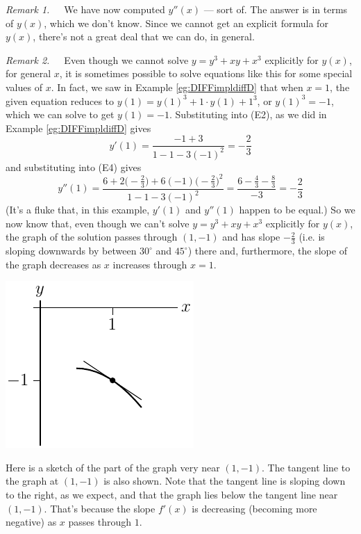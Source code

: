 \begin{eg}
\noindent\emph{Remark 1.}\ \ \ We have now computed $y''(x)$ --- sort of.
The answer is in terms of $y(x)$, which we don't know. Since we cannot
get an explicit formula for $y(x)$, there's not a great deal that we can do,
in general.

\noindent\emph{Remark 2.}\ \ \ Even though we cannot solve
$y=y^3+xy+x^3$ explicitly for $y(x)$, for general $x$, it is sometimes
possible to solve equations like this for some special values of $x$.
In fact, we saw in Example \ref{eg:DIFFimpldiffD} that when $x=1$,
the given equation reduces to $y(1)=y(1)^3+1\cdot y(1)+1^3$, or $y(1)^3=-1$,
which we can solve to get $y(1)=-1$. Substituting into (E2),
as we did in  Example \ref{eg:DIFFimpldiffD} gives
\begin{equation*}
y'(1) = \frac{-1+3}{1-1-3(-1)^2} = -\frac{2}{3}
\end{equation*}
and substituting into (E4) gives
\begin{equation*}
y''(1) = \frac{6+2\big(-\frac{2}{3}\big)+6(-1)\big(-\frac{2}{3}\big)^2}
                             {1-1-3(-1)^2}
   =\frac{6-\frac{4}{3}-\frac{8}{3}}{-3}
   = -\frac{2}{3}
\end{equation*}
(It's a fluke that, in this example, $y'(1)$ and $y''(1)$ happen to be equal.)
So we now know that, even though we can't solve $y=y^3+xy+x^3$ explicitly for
$y(x)$, the graph of the solution passes through $(1,-1)$ and has slope
$-\frac{2}{3}$ (i.e. is sloping downwards by between $30^\circ$ and $45^\circ$)
there and, furthermore, the slope of the graph decreases as $x$
increases through $x=1$.

\begin{efig}
 \begin{center}
 \includegraphics{concaveDown}
 \end{center}
\end{efig}
Here is a sketch of the part of the graph very near $(1, -1)$. The tangent line to the
graph at $(1, -1)$ is also shown. Note that the tangent line is sloping down to the right,
as we expect, and that the graph lies below the tangent line near $(1,-1)$. That's because
the slope $f'(x)$ is decreasing (becoming more negative) as $x$ passes through $1$.


\end{eg}

